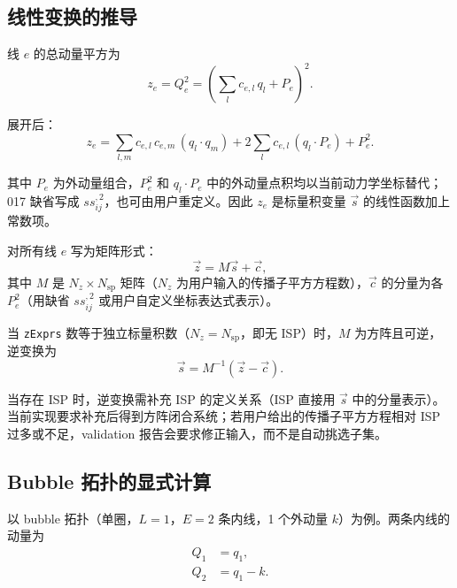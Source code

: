 ﻿\documentclass[a4paper,11pt]{article}
\begin{document}
\subsection{线性变换的推导}

线 $e$ 的总动量平方为
\begin{equation}
  z_e = Q_e^2 = \left(\sum_l c_{e,l}\, q_l + P_e\right)^2.
  \label{zeExpand}
\end{equation}

展开后：
\begin{equation}
  z_e = \sum_{l,m} c_{e,l}\, c_{e,m}\, (q_l \cdot q_m) + 2 \sum_l c_{e,l}\, (q_l \cdot P_e) + P_e^2.
  \label{zeExpandFull}
\end{equation}

其中 $P_e$ 为外动量组合，$P_e^2$ 和 $q_l \cdot P_e$ 中的外动量点积均以当前动力学坐标替代；017 缺省写成 $ss_{ij}^{,2}$，也可由用户重定义。因此 $z_e$ 是标量积变量 $\vec{s}$ 的线性函数加上常数项。

对所有线 $e$ 写为矩阵形式：
\begin{equation}
  \vec{z} = M \vec{s} + \vec{c},
  \label{zLinear}
\end{equation}
其中 $M$ 是 $N_z \times N_{\text{sp}}$ 矩阵（$N_z$ 为用户输入的传播子平方方程数），$\vec{c}$ 的分量为各 $P_e^2$（用缺省 $ss_{ij}^{,2}$ 或用户自定义坐标表达式表示）。

当 \texttt{zExprs} 数等于独立标量积数（$N_z = N_{\text{sp}}$，即无 ISP）时，$M$ 为方阵且可逆，逆变换为
\begin{equation}
  \vec{s} = M^{-1}(\vec{z} - \vec{c}).
  \label{zInverse}
\end{equation}

当存在 ISP 时，逆变换需补充 ISP 的定义关系（ISP 直接用 $\vec{s}$ 中的分量表示）。当前实现要求补充后得到方阵闭合系统；若用户给出的传播子平方方程相对 ISP 过多或不足，validation 报告会要求修正输入，而不是自动挑选子集。

\subsection{Bubble 拓扑的显式计算}

以 bubble 拓扑（单圈，$L=1$，$E=2$ 条内线，1 个外动量 $k$）为例。两条内线的动量为
\begin{align}
  Q_1 &= q_1, \\
  Q_2 &= q_1 - k.
\end{align}
\end{document}
